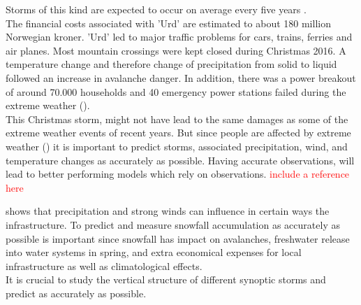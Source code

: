 Storms of this kind are expected to occur on average every five years \citep{olsen_ekstremvaerrapport._2017}. \\ 
The financial costs associated with 'Urd' are estimated to about 180 million Norwegian kroner.
'Urd' led to major traffic problems for cars, trains, ferries and air planes. Most mountain crossings were kept closed during Christmas 2016.  A temperature change and therefore change of precipitation from solid to liquid followed an increase in avalanche danger.
In addition, there was a power breakout of around 70.000 households and 40 emergency power stations failed during the extreme weather (). 
\\
This Christmas storm, might not have lead to the same damages as some of the extreme weather events of recent years. But since people are affected by extreme weather () it is important to predict storms, associated precipitation, wind, and temperature changes as accurately as possible. Having accurate observations, will lead to better performing models which rely on observations. \textcolor{red}{include a reference here}

\newline
\noindent
{} shows that precipitation and strong winds can influence in certain ways the infrastructure. To predict and measure snowfall accumulation as accurately as possible is important since snowfall has impact on avalanches, freshwater release into water systems in spring, and extra economical expenses for local infrastructure as well as climatological effects. \\
It is crucial to study the vertical structure of different synoptic storms and  predict as accurately as possible.\\
